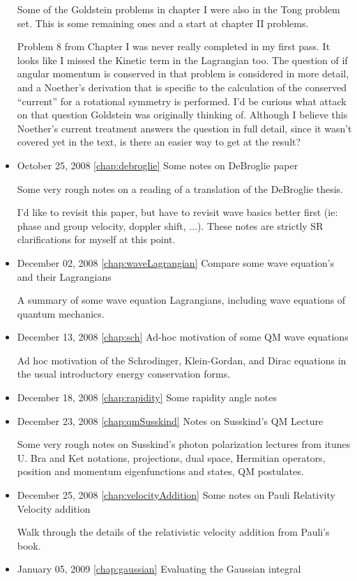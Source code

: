 \begin{itemize}
Some of the Goldstein problems in chapter I were also in the Tong problem set. This is some remaining ones and a start at chapter II problems.

Problem 8 from Chapter I was never really completed in my first pass.  It looks like I missed the Kinetic term in the Lagrangian too.  The question of if angular momentum is conserved in that problem is considered in more detail, and a Noether's derivation that is specific to the calculation of the conserved ``current'' for a rotational symmetry is performed.  I'd be curious what attack on that question Goldstein was originally thinking of.  Although I believe this Noether's current treatment answers the question in full detail, since it wasn't covered yet in the text, is there an easier way to get at the result?
\item October 25, 2008 \ref{chap:debroglie} Some notes on DeBroglie paper

Some very rough notes on a reading of a translation of the DeBroglie thesis. 

I'd like to revisit this paper, but have to revisit wave basics better first (ie: phase and group velocity, doppler shift, ...).   These notes are strictly SR clarifications for myself at this point.\item December 02, 2008 \ref{chap:waveLagrangian} Compare some wave equation's and their Lagrangians

A summary of some wave equation Lagrangians, including wave equations of quantum mechanics.\item December 13, 2008 \ref{chap:sch} Ad-hoc motivation of some QM wave equations

Ad hoc motivation of the Schrodinger, Klein-Gordan, and Dirac equations in the usual introductory energy conservation forms.\item December 18, 2008 \ref{chap:rapidity} Some rapidity angle notes

\item December 23, 2008 \ref{chap:qmSusskind} Notes on Susskind's QM Lecture

Some very rough notes on Susskind's photon polarization lectures from itunes U.  Bra and Ket notations, projections, dual space, Hermitian operators, position and momentum eigenfunctions and states, QM postulates.\item December 25, 2008 \ref{chap:velocityAddition} Some notes on Pauli Relativity Velocity addition

Walk through the details of the relativistic velocity addition from Pauli's book.\item January 05, 2009 \ref{chap:gaussian} Evaluating the Gaussian integral


\end{itemize}
